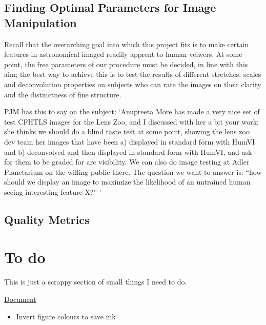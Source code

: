 \documentclass[letterpaper, 11pt]{article}
\begin{document}
\subsection{Finding Optimal Parameters for Image Manipulation}

Recall that the overarching goal into which this project fits is to make certain features in astronomical imaged readily apprent to human veiwers. At some point, the free parameters of our procedure must be decided, in line with this aim; the best way to achieve this is to test the results of different stretches, scales and deconvolution properties on subjects who can rate the images on their clarity and the distinctness of fine structure.

PJM has this to say on the subject: `Anupreeta More has made a very nice set of test CFHTLS images for the
Lens Zoo, and I discussed with her a bit your work: she thinks we
should do a blind taste test at some point, showing the lens zoo dev
team her images that have been a) displayed in standard form with
HumVI and b) deconvolved and then
displayed in standard form with HumVI, and ask for them to be graded
for arc visibility. We can also do image testing at Adler Planetarium on the willing public there. The question we want to answer is: ``how should we display an image to maximize the likelihood of an untrained human seeing interesting feature X?'' '


\subsection{Quality Metrics}




\newpage
\section{To do}

This is just a scrappy section of small things I need to do.

\underline{Document}
\begin{itemize}
	\item Invert figure colours to save ink
\end{itemize}
\end{document}
